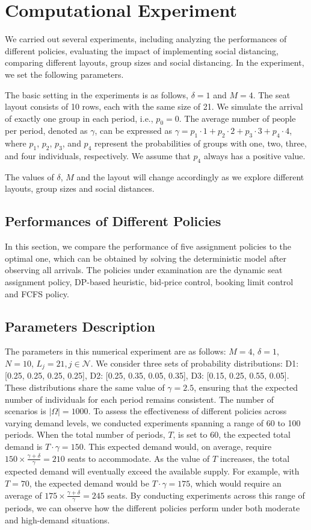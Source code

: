 \section{Computational Experiment}
We carried out several experiments, including analyzing the performances of different policies, evaluating the impact of implementing social distancing, comparing different layouts, group sizes and social distancing. In the experiment, we set the following parameters. 

The basic setting in the experiments is as follows, $\delta =1$ and $M =4$. The seat layout consists of 10 rows, each with the same size of 21. We simulate the arrival of exactly one group in each period, i.e., $p_0 = 0$. The average number of people per period, denoted as $\gamma$, can be expressed as $\gamma = p_1 \cdot 1 + p_2 \cdot 2 + p_3 \cdot 3 + p_4 \cdot 4$, where $p_1$, $p_2$, $p_3$, and $p_4$ represent the probabilities of groups with one, two, three, and four individuals, respectively. We assume that $p_4$ always has a positive value.

The values of $\delta$, $M$ and the layout will change accordingly as we explore different layouts, group sizes and social distances.

\subsection{Performances of Different Policies}
In this section, we compare the performance of five assignment policies to the optimal one, which can be obtained by solving the deterministic model after observing all arrivals. The policies under examination are the dynamic seat assignment policy, DP-based heuristic, bid-price control, booking limit control and FCFS policy.

\subsection*{Parameters Description}
The parameters in this numerical experiment are as follows: $M = 4$, $\delta = 1$, $N = 10$, $L_j = 21, j \in \mathcal{N}$. We consider three sets of probability distributions: D1: [0.25, 0.25, 0.25, 0.25], D2: [0.25, 0.35, 0.05, 0.35], D3: [0.15, 0.25, 0.55, 0.05]. These distributions share the same value of $\gamma = 2.5$, ensuring that the expected number of individuals for each period remains consistent. The number of scenarios is $|\Omega| = 1000$. To assess the effectiveness of different policies across varying demand levels, we conducted experiments spanning a range of 60 to 100 periods. When the total number of periods, $T$, is set to 60, the expected total demand is $T \cdot \gamma = 150$. This expected demand would, on average, require $150 \times \frac{\gamma + \delta}{\gamma} = 210$ seats to accommodate. As the value of $T$ increases, the total expected demand will eventually exceed the available supply. For example, with $T = 70$, the expected demand would be $T \cdot \gamma = 175$, which would require an average of $175 \times \frac{\gamma + \delta}{\gamma} = 245$ seats. By conducting experiments across this range of periods, we can observe how the different policies perform under both moderate and high-demand situations.

